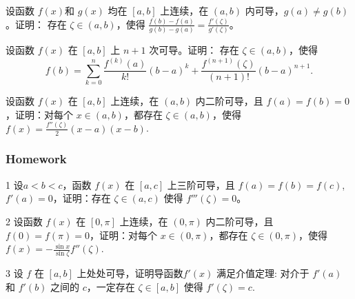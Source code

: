 \documentclass[CJK,13pt]{beamer}
\begin{document}
\begin{frame}
  设函数 $f(x)$和 $g(x)$ 均在 $[a,b]$ 上连续，在 $(a,b)$ 内可导，$g(a)\ne g(b)$。证明： 存在 $\zeta\in(a,b)$，使得 $\frac{f(b)-f(a)}{g(b)-g(a)} = \frac{f'(\zeta)}{g'(\zeta)}$。
\end{frame}


\begin{frame}
  设函数 $f(x)$ 在 $[a,b]$ 上 $n+1$ 次可导。证明： 存在 $\zeta\in(a, b)$，使得
  $$ f(b) = \sum_{k=0}^n \frac{f^{(k)}(a)}{k!}(b-a)^k + \frac{f^{(n+1)}(\zeta)}{(n+1)!}(b-a)^{n+1} .$$
\end{frame}


\begin{frame}
  设函数 $f(x)$ 在 $[a,b]$ 上连续，在 $(a,b)$ 内二阶可导，且 $f(a)=f(b)=0$，证明：对每个 $x\in (a,b)$，都存在 $\zeta\in(a,b)$，使得 $f(x)=\frac{f''(\zeta)}{2}(x-a)(x-b)$.
\end{frame}


\begin{frame}
  \frametitle{Homework}
  \bitem
\item[1]{设$a<b<c$，函数 $f(x)$ 在 $[a,c]$ 上三阶可导，且 $f(a)=f(b)=f(c)$, $f'(a) = 0$，证明：存在 $\zeta\in(a,c)$ 使得 $f'''(\zeta)=0$。}
\item[2]{设函数 $f(x)$ 在 $[0,\pi]$ 上连续，在 $(0,\pi)$ 内二阶可导，且 $f(0)=f(\pi)=0$，证明：对每个 $x\in (0,\pi)$，都存在 $\zeta\in(0,\pi)$，使得 $f(x)= - \frac{\sin x}{\sin \zeta}f''(\zeta)$.
}
\item[3]{设 $f$ 在 $[a,b]$ 上处处可导，证明导函数$f'(x)$ 满足介值定理: 对介于 $f'(a)$ 和 $f'(b)$ 之间的 $c$，一定存在 $\zeta\in [a,b]$ 使得 $f'(\zeta)=c$.}  
  \eitem
\end{frame}

\ech
\end{document}
